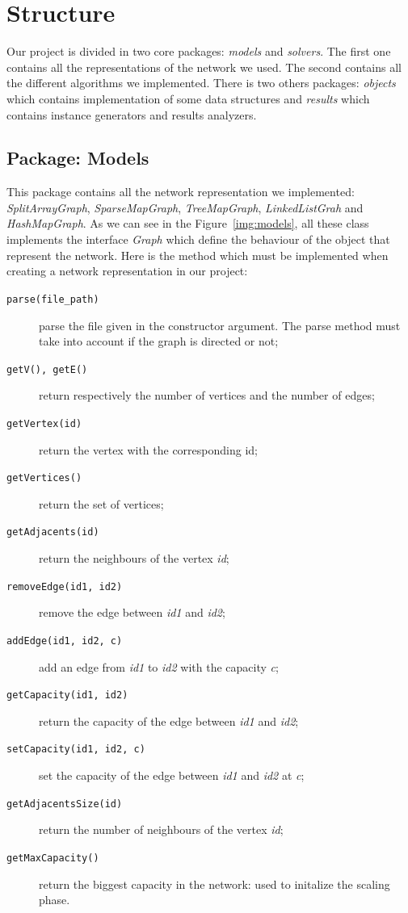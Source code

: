 \section{Structure}

Our project is divided in two core packages: \textit{models} and \textit{solvers}. The first one contains all the representations of the network we used. The second contains all the different algorithms we implemented. There is two others packages: \textit{objects} which contains implementation of some data structures and \textit{results} which contains instance generators and results analyzers.

\subsection{Package: Models}

This package contains all the network representation we implemented: \textit{SplitArrayGraph}, \textit{SparseMapGraph}, \textit{TreeMapGraph}, \textit{LinkedListGrah} and \textit{HashMapGraph}. As we can see in the Figure~\ref{img:models}, all these class implements the interface \textit{Graph} which define the behaviour of the object that represent the network. Here is the method which must be implemented when creating a network representation in our project:
\begin{description}
	\item[\texttt{parse(file\_path)}] parse the file given in the constructor argument. The parse method must take into account if the graph is directed or not;
	\item[\texttt{getV(), getE()}] return respectively the number of vertices and the number of edges;
	\item[\texttt{getVertex(id)}] return the vertex with the corresponding id;
	\item[\texttt{getVertices()}] return the set of vertices;
	\item[\texttt{getAdjacents(id)}] return the neighbours of the vertex \textit{id};
	\item[\texttt{removeEdge(id1, id2)}] remove the edge between \textit{id1} and \textit{id2};
	\item[\texttt{addEdge(id1, id2, c)}] add an edge from \textit{id1} to \textit{id2} with the capacity \textit{c};
	\item[\texttt{getCapacity(id1, id2)}] return the capacity of the edge between \textit{id1} and \textit{id2};
	\item[\texttt{setCapacity(id1, id2, c)}] set the capacity of the edge between \textit{id1} and \textit{id2} at \textit{c};
	\item[\texttt{getAdjacentsSize(id)}] return the number of neighbours of the vertex \textit{id};
	\item[\texttt{getMaxCapacity()}] return the biggest capacity in the network: used to initalize the scaling phase.
\end{description}

